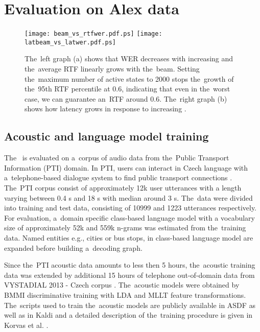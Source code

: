\section{Evaluation on Alex data}
\label{sec:eval}

\begin{figure*}[t]
    \begin{center}
    \texttt{[image: beam\_vs\_rtfwer.pdf.ps]}
    \texttt{[image: latbeam\_vs\_latwer.pdf.ps]}
    \caption{The~left graph (a) shows that WER decreases with increasing  and the~average RTF linearly grows with the~beam.
    Setting the~maximum number of active states to 2000 stops the~growth of the~95th RTF percentile at 0.6, indicating that even in the~worst case, we can guarantee an~RTF around 0.6.
    The~right graph (b) shows how latency grows in response to increasing .}
    \label{fig:wer} 
    \end{center}
\end{figure*}

\subsection{Acoustic and language model training}
\label{sec:train}

The~ is evaluated on a~corpus of audio data from the~Public Transport Information (PTI) domain.
In PTI, users can interact in Czech language with a~telephone-based dialogue system to find public transport connections \cite{ptics2014url}.
The~PTI corpus consist of approximately 12k user utterances with a length varying between 0.4 s and 18 s with median around 3 s.
The~data were divided into training and test data, consisting of 10999 and 1223 utterances respectively.
For evaluation, a~domain specific class-based language model with a vocabulary size of approximately 52k  and 559k n-grams was estimated from the~training data.
Named entities e.g., cities or bus stops, in class-based language model are expanded before building a~decoding graph.

Since the~PTI acoustic data amounts to less then 5 hours, the~acoustic training data was extended by additional 15 hours of telephone out-of-domain data from VYSTADIAL 2013 - Czech corpus \cite{korvas_2014}.
The~acoustic models were obtained by BMMI discriminative training with LDA and MLLT feature transformations.
The~scripts used to train the~acoustic models are publicly available in ASDF \cite{asdf2014url} as well as in Kaldi \cite{kaldi2014url} and a detailed description of the~training procedure is given in Korvas et al. \cite{korvas_2014}.

